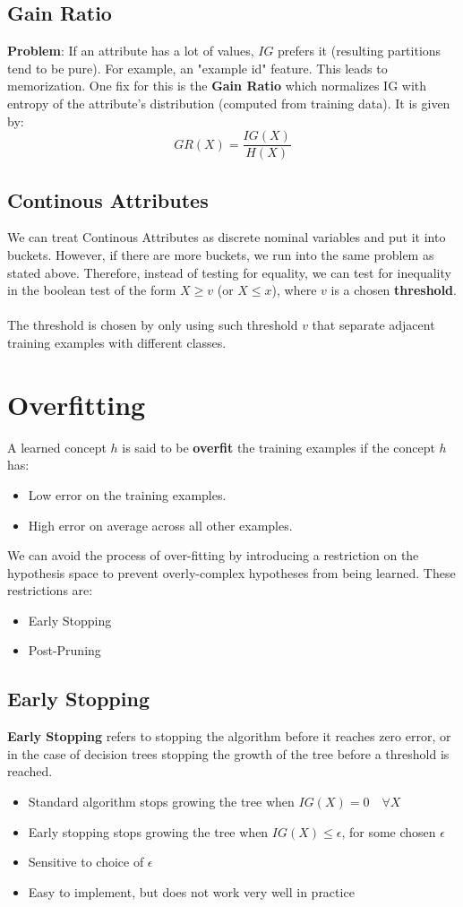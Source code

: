 \documentclass[12pt, a4paper]{book}
\begin{document}
\subsection{Gain Ratio}
\textbf{Problem}: If an attribute has a lot of values, $IG$ prefers it (resulting partitions tend to be pure). For example, an "example id" feature. This leads to memorization. One fix for this is the \textbf{Gain Ratio} which normalizes IG with entropy of the attribute’s distribution (computed from training data). It is given by:
$$GR(X) = \frac{IG(X)}{H(X)}$$

\subsection{Continous Attributes}
We can treat Continous Attributes as discrete nominal variables and put it into buckets. However, if there are more buckets, we run into the same problem as stated above. Therefore, instead of testing for equality, we can test for inequality in the boolean test of the form $X \geq v$ (or $X \leq x$), where $v$ is a chosen \textbf{threshold}.\\\\
The threshold is chosen by only using such threshold $v$ that separate adjacent training examples with different classes.

\section{Overfitting}
A learned concept $h$ is said to be \textbf{overfit} the training examples if the concept $h$ has:
\begin{itemize}
    \item Low error on the training examples.
    \item High error on average across all other examples.
\end{itemize}
We can avoid the process of over-fitting by introducing a restriction on the hypothesis space to prevent overly-complex hypotheses from being learned. These restrictions are:
\begin{itemize}
    \item Early Stopping
    \item Post-Pruning
\end{itemize}

\subsection{Early Stopping}
\textbf{Early Stopping} refers to stopping the algorithm before it reaches zero error, or in the case of decision trees stopping the growth of the tree before a threshold is reached.
\begin{itemize}
    \item Standard algorithm stops growing the tree
when $IG(X)=0 \quad \forall X$
    \item Early stopping stops growing the tree when
    $IG(X) \leq \epsilon$, for some chosen $\epsilon$
    \item Sensitive to choice of $\epsilon$
    \item Easy to implement, but does not work very
well in practice
\end{itemize}
\end{document}
